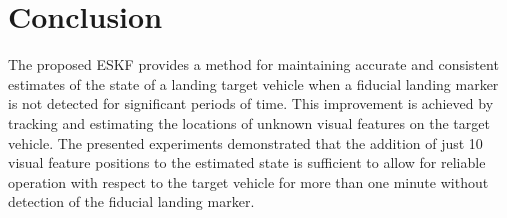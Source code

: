 \section{Conclusion} \label{sec:conclusion}
The proposed ESKF provides a method for maintaining accurate and consistent
estimates of the state of a landing target vehicle when a fiducial landing marker is
not detected for significant periods of time. This improvement is achieved by
tracking and estimating the locations of unknown visual features on the target
vehicle.
The presented experiments demonstrated that the addition of just 10 visual
feature positions to the estimated state
is sufficient to allow for reliable operation with respect to the target vehicle
for more than one
minute without detection of the fiducial landing marker.

